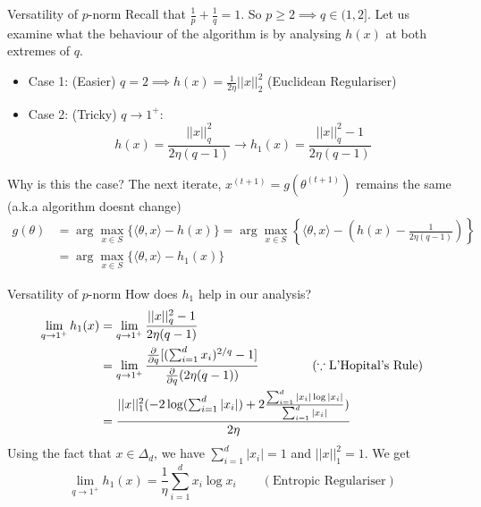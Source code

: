 \begin{frame}{Versatility of $p$-norm}
    Recall that $\frac{1}{p} + \frac{1}{q} = 1$. So $p \geq 2 \implies q \in (1, 2]$. Let us examine what the behaviour of the algorithm is by analysing $h(x)$ at both extremes of $q$.
    \begin{itemize}
        \item Case 1: (Easier) $q = 2 \implies h(x) = \frac{1}{2\eta}||x||_2^2$ (Euclidean Regulariser) \pause
        \item Case 2: (Tricky) $q \to 1^+$: \begin{equation*}
            h(x) = \frac{||x||_q^2}{2\eta(q-1)} \to h_1(x) = \frac{||x||_q^2 - 1}{2\eta(q-1)}
        \end{equation*}
    \end{itemize}\pause
    Why is this the case? The next iterate, $x^{(t+1)} = g(\theta^{(t+1)})$ remains the same (a.k.a algorithm doesnt change)
    \begin{align*}
    g(\theta) &= \arg\max_{x \in S} \{\langle \theta, x \rangle - h(x)\}= \arg\max_{x \in S} \left\{\langle \theta, x \rangle - \left(h(x) - \frac{1}{2\eta (q-1)}\right)\right\}\\
     &= \arg\max_{x \in S} \{\langle \theta, x \rangle - h_1(x)\}
\end{align*}
\end{frame}

\begin{frame}{Versatility of $p$-norm}
    How does $h_1$ help in our analysis?
    \begin{align*}
    \lim_{q \to 1^+} h_1(x) &= \lim_{q \to 1^+} \frac{||x||_q^2 - 1}{2\eta(q-1)}\\
    &= \lim_{q \to 1^+}\frac{\frac{\partial}{\partial q}[(\sum_{i=1}^d x_i)^{2/q}-1]}{\frac{\partial}{\partial q}(2 \eta (q-1))} \hspace{1.5cm}(\because \text{L'Hopital's Rule})\\
    &= \frac{||x||_1^2(-2 \log(\sum_{i=1}^d |x_i|)+ 2 \frac{\sum_{i=1}^d |x_i|\log|x_i|}{\sum_{i=1}^d |x_i|})}{2\eta}
\end{align*}\pause
Using the fact that $x \in \Delta_d$, we have $\sum_{i=1}^d |x_i|=1$ and $||x||_1^2 = 1$. We get 
\begin{equation*}
    \lim_{q \to 1^+} h_1(x) = \frac{1}{\eta} \sum_{i=1}^d x_i \log x_i\qquad(\text{Entropic Regulariser})
\end{equation*}
\end{frame}

